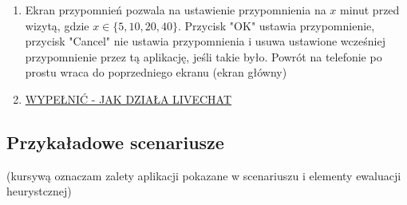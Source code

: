 \documentclass[12pt]{article}
\begin{document}
\begin {enumerate}
	\item Ekran przypomnień pozwala na ustawienie przypomnienia na $x$ minut przed wizytą, gdzie $x\in\{5, 10, 20, 40\}$. Przycisk "OK" ustawia przypomnienie, przycisk "Cancel" nie ustawia przypomnienia i usuwa ustawione wcześniej przypomnienie przez tą aplikację, jeśli takie było. Powrót na telefonie po prostu wraca do poprzedniego ekranu (ekran główny)
	
	\item \underline{WYPEŁNIĆ - JAK DZIAŁA LIVECHAT}
	
\end{enumerate}


\clearpage
\subsection{Przykaładowe scenariusze}
(kursywą oznaczam zalety aplikacji pokazane w scenariuszu i elementy ewaluacji heurystcznej)
\end{document}
